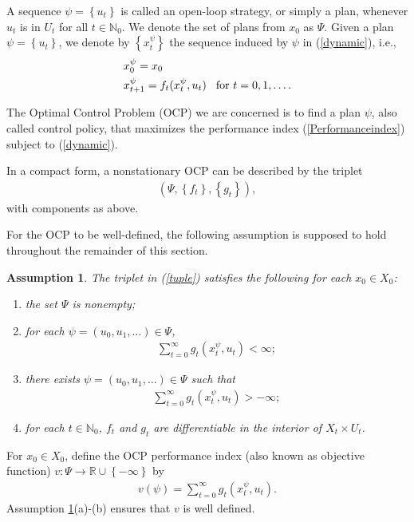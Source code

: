 \documentclass[3p]{elsarticle}
\newcommand{\nat}{\mathbb N_0}
\newtheorem{assu}[thm]{Assumption}
\begin{document}
	
	A sequence $\psi=\left\lbrace u_t\right\rbrace $ is called an open-loop strategy, or simply a plan, whenever $u_t$ is in $ U_t$ for all $t\in\nat$. We denote the set of plans from $x_0$ as $\Psi$.
	Given a plan $\psi=\left\lbrace u_t \right\rbrace $, we denote by $\left\lbrace x_t^\psi \right\rbrace $ the sequence induced by $\psi$ in (\ref{dynamic}), i.e., 
	\begin{align*}
	&x_0^\psi=x_0\\
	&x_{t+1}^\psi=f_t(x_t^\psi,u_t) \hspace{0.3cm}\text{for $t=0,1,\dots$}.
	\end{align*}
	
	
	
	
	The Optimal Control Problem (OCP) we are concerned is to find a plan $\psi$, also called control policy, that maximizes the performance index (\ref{Performanceindex}) subject to (\ref{dynamic}). 
	
	In a compact form, a nonstationary OCP can be described by the triplet
	\begin{align}\label{tuple}
	(\Psi, \left\lbrace f_t\right\rbrace, \left\lbrace g_t\right\rbrace),
	\end{align} 
	with components as above. 
	
	For the OCP to be well-defined, the following assumption is supposed to hold throughout the remainder of this section.
	
	
	\begin{assu}\label{WellPosed}
		The triplet in (\ref{tuple}) satisfies the following for each $x_0\in X_0$:
		\begin{enumerate}
			\item[(a)] the set $\Psi$ is nonempty;
			
			\item[(b)] for each $\psi=(u_0,u_1,\dots)\in\Psi$, 
			\begin{align*}
			\sum_{t=0}^\infty g_t(x_t^\psi,u_t)<\infty;
			\end{align*}
			\item[(c)] there exists $\psi=(u_0,u_1,\dots)\in\Psi$ such that 
			\begin{align*}
			\sum_{t=0}^\infty g_t(x_t^\psi,u_t)>-\infty;
			\end{align*}
			\item[(d)] for each $t\in\nat$, $f_t$ and $g_t$ are differentiable in the interior of $X_t\times U_t$.
		\end{enumerate}
	\end{assu}
	For $x_0\in X_0$, define the OCP performance index (also known as objective function) $v:\Psi\to\mathbb R\cup\left\lbrace -\infty\right\rbrace $ by
	\begin{align}\label{PI}
	v(\psi)=\sum_{t=0}^\infty g_t(x_t^\psi,u_t).
	\end{align}
	Assumption \ref{WellPosed}(a)-(b) ensures that $v$ is well defined.
	
\end{document}
